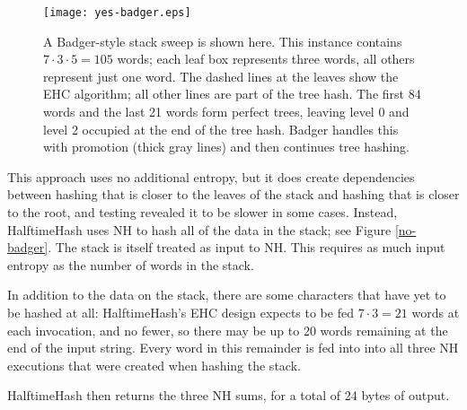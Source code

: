 \documentclass[runningheads]{llncs}
\begin{document}
\begin{figure}
\texttt{[image: yes-badger.eps]}
\caption{\label{yes-badger}
  A Badger-style stack sweep is shown here.
  This instance contains $7 \cdot 3 \cdot 5 = 105$ words; each leaf box represents three words, all others represent just one word.
  The dashed lines at the leaves show the EHC algorithm; all other lines are part of the tree hash.
  The first 84 words and the last 21 words form perfect trees, leaving level 0 and level 2 occupied at the end of the tree hash.
  Badger handles this with promotion (thick gray lines) and then continues tree hashing. \cite{badger}
}
\end{figure}

This approach uses no additional entropy, but it does create dependencies between hashing that is closer to the leaves of the stack and hashing that is closer to the root, and testing revealed it to be slower in some cases.
Instead, HalftimeHash uses NH to hash all of the data in the stack; see Figure \ref{no-badger}.
The stack is itself treated as input to NH.
This requires as much input entropy as the number of words in the stack.


In addition to the data on the stack, there are some characters that have yet to be hashed at all: HalftimeHash's EHC design expects to be fed $7 \cdot 3 = 21$ words at each invocation, and no fewer, so there may be up to 20 words remaining at the end of the input string.
Every word in this remainder is fed into into all three NH executions that were created when hashing the stack.

HalftimeHash then returns the three NH sums, for a total of 24 bytes of output.

\end{document}
